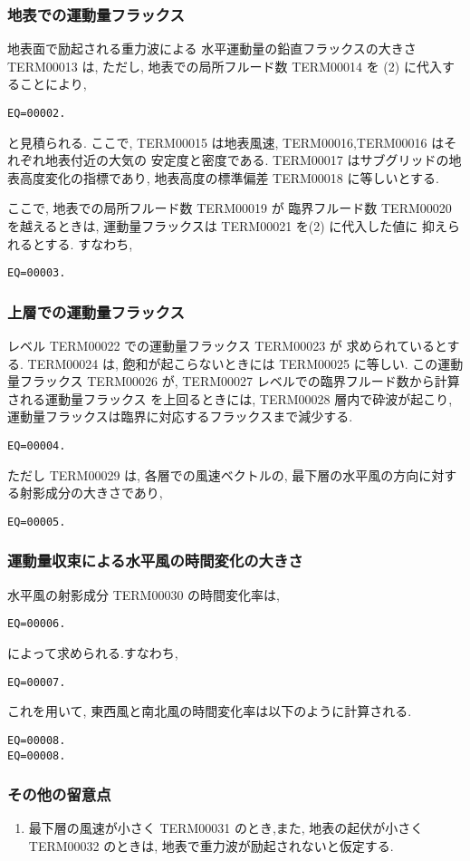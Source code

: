 \subsubsection{地表での運動量フラックス}

地表面で励起される重力波による
水平運動量の鉛直フラックスの大きさ TERM00013 は,
ただし, 地表での局所フルード数 
TERM00014 を
(2) に代入することにより,
%
\begin{verbatim}
EQ=00002.
\end{verbatim}
%
と見積られる.
ここで, 
TERM00015 は地表風速,
TERM00016,TERM00016 はそれぞれ地表付近の大気の
安定度と密度である.
TERM00017 はサブグリッドの地表高度変化の指標であり,
地表高度の標準偏差 TERM00018 に等しいとする.

ここで, 地表での局所フルード数 
TERM00019 が 臨界フルード数
TERM00020 を越えるときは, 
運動量フラックスは TERM00021 を(2) に代入した値に
抑えられるとする.
すなわち,
\begin{verbatim}
EQ=00003.
\end{verbatim}

\subsubsection{上層での運動量フラックス}

レベル TERM00022 での運動量フラックス TERM00023 が
求められているとする.
TERM00024 は, 飽和が起こらないときには
TERM00025 に等しい.
この運動量フラックス TERM00026 が,
TERM00027 レベルでの臨界フルード数から計算される運動量フラックス
を上回るときには, TERM00028 層内で砕波が起こり,
運動量フラックスは臨界に対応するフラックスまで減少する.

\begin{verbatim}
EQ=00004.
\end{verbatim}

ただし TERM00029 は,
各層での風速ベクトルの,
最下層の水平風の方向に対する射影成分の大きさであり,
\begin{verbatim}
EQ=00005.
\end{verbatim}

\subsubsection{運動量収束による水平風の時間変化の大きさ}

水平風の射影成分 TERM00030 の時間変化率は,
\begin{verbatim}
EQ=00006.
\end{verbatim}
%
によって求められる.すなわち,
%
\begin{verbatim}
EQ=00007.
\end{verbatim}
%
これを用いて,
東西風と南北風の時間変化率は以下のように計算される.
\begin{verbatim}
EQ=00008.
EQ=00008.
\end{verbatim}

\subsubsection{その他の留意点}

\begin{enumerate}
\item 最下層の風速が小さく TERM00031 のとき,また,
      地表の起伏が小さく TERM00032 のときは, 
      地表で重力波が励起されないと仮定する.
\end{enumerate}

